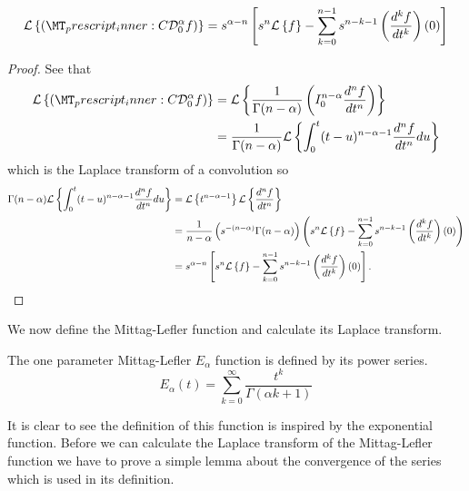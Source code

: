 \documentclass{article}
\begin{document}
\begin{lemma}
\label{lem:lap_cap}

	\begin{align*}
		\laplace{\capder{0}{\alpha}{f}} = s^{\alpha - n} \left[ s^n \laplace{f} - \sum_{k=0}^{n-1} s^{n-k-1} \left( \der{f}{t}{k} \right)(0) \right]
	\end{align*}
\end{lemma}
\begin{proof}
	See that
	\begin{align*}
		\laplace{\capder{0}{\alpha}{f}} &= \laplace{ \frac{1}{\Gamma(n-\alpha)} \rli{0}{n-\alpha}{\der{f}{t}{n}}} \\
			&= \frac{1}{\Gamma(n-\alpha)}\laplace{ \int_0^t (t-u)^{n-\alpha-1} \der{f}{t}{n} du} \\ 
	\end{align*}
	which is the Laplace transform of a convolution so
	\begin{align*}
		\Gamma(n-\alpha)\mathcal{L} \left\{  \int_0^t (t-u)^{n-\alpha-1} \frac{d^{n}f}{dt^{n}} du \right\} &= \mathcal{L} \left\{ t^{n-\alpha-1} \right\} \mathcal{L} \left\{ \frac{d^{n}f}{dt^{n}} \right\} \\
		&= \frac{1}{n-\alpha} \left( s^{-(n-\alpha)} \Gamma(n-\alpha) \right) \left( s^n \mathcal{L} \left\{ f \right\} - \sum_{k=0}^{n-1} s^{n-k-1} \left( \frac{d^{k}f}{dt^{k}} \right)(0) \right) \\
		&= s^{\alpha - n} \left[ s^n \mathcal{L} \left\{ f \right\} - \sum_{k=0}^{n-1} s^{n-k-1} \left( \frac{d^{k}f}{dt^{k}} \right)(0) \right].
	\end{align*}	
\end{proof}

We now define the Mittag-Lefler function and calculate its Laplace transform.

\begin{definition}
	The one parameter Mittag-Lefler $ E_\alpha $ function is defined by its power series.
	$$
		E_\alpha(t) = \sum_{k=0}^{\infty} \frac{t^k}{\Gamma(\alpha k + 1)}
	$$
\end{definition}
It is clear to see the definition of this function is inspired by the exponential function. Before we can calculate the 
Laplace transform of the Mittag-Lefler function we have to prove a simple lemma about the convergence of the 
series which is used in its definition.
\end{document}
